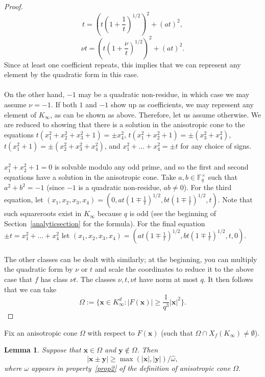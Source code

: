 \documentclass[10pt]{amsart}
\theoremstyle{plain}
\theoremstyle{plain}
\newtheorem{lemma}[theorem]{Lemma}
\renewcommand{\vec}[1]{\mathbf{#1}}
\theoremstyle{remark}
\newtheorem{remark}[equation]{Remark}
\theoremstyle{definition}
\renewcommand{\hat}{\widehat}
\newcommand{\Ki}{K_\infty}
\begin{document}
\begin{proof}
\[t=\left(t\left(1+\frac{1}{t}\right)^{1/2}\right)^2+(at)^2,\]
\[\nu t=\left(t\left(1+\frac{\nu}{t}\right)^{1/2}\right)^2+(at)^2.\]
Since at least one coefficient repeats, this implies that we can represent any element by the quadratic form in this case.\\
\\
On the other hand, $-1$ may be a quadratic non-residue, in which case we may assume $\nu=-1$. If both $1$ and $-1$ show up as coefficients, we may represent any element of $\Ki$, as can be shown as above. Therefore, let us assume otherwise. We are reduced to showing that there is a solution in the anisotropic cone to the equations $t(x_1^2+x_2^2+x_3^2+1)=\pm x_4^2$, $t(x_1^2+x_2^2+1)=\pm (x_3^2+x_4^2)$, $t(x_1^2+1)=\pm (x_2^2+x_3^2+x_4^2)$, and $x_1^2+\hdots+x_4^2=\pm t$ for any choice of signs.\\
\\
$x_1^2+x_2^2+1=0$ is solvable modulo any odd prime, and so the first and second equations have a solution in the anisotropic cone. Take $a,b\in\mathbb{F}_q^{\times}$ such that $a^2+b^2=-1$ (since $-1$ is a quadratic non-residue, $ab\neq 0$). For the third equation, let $(x_1,x_2,x_3,x_4)=\left(0,at\left(1\mp\frac{1}{t}\right)^{1/2},bt\left(1\mp\frac{1}{t}\right)^{1/2},t\right)$. Note that such squareroots exist in $\Ki$ because $q$ is odd (see the beginning of Section~\ref{analyticsection} for the formula). For the final equation $\pm t=x_1^2+\hdots+x_4^2$ let $(x_1,x_2,x_3,x_4)=\left(at\left(1\mp\frac{1}{t}\right)^{1/2},bt\left(1\mp\frac{1}{t}\right)^{1/2},t,0\right)$.\\
\\
The other classes can be dealt with similarly; at the beginning, you can multiply the quadratic form by $\nu$ or $t$ and scale the coordinates to reduce it to the above case that $f$ has class $\nu t$. The classes $\nu,t,\nu t$ have norm at most $q$. It then follows that we can take
\[\Omega:=\{\vec{x}\in\Ki^d:|F(\vec{x})|\geq \frac{1}{q^3}|\vec{x}|^2\}.\]
\end{proof}
Fix an anisotropic cone $\Omega$  with respect to $F(\vec{x})$ (such that $\Omega\cap X_f(\Ki)\neq\emptyset$). 
\begin{lemma}\label{ultra}
Suppose that $\vec{x}\in \Omega$ and $\vec{y}\notin \Omega.$ Then
\[
|\vec{x}\pm \vec{y}|\geq \max{(|\vec{x}|,|\vec{y}|)}/\hat{\omega},
\]
where $\omega$ appears in property~\eqref{prop2} of the definition of anisotropic cone $\Omega.$ 
\end{lemma}
\end{document}
